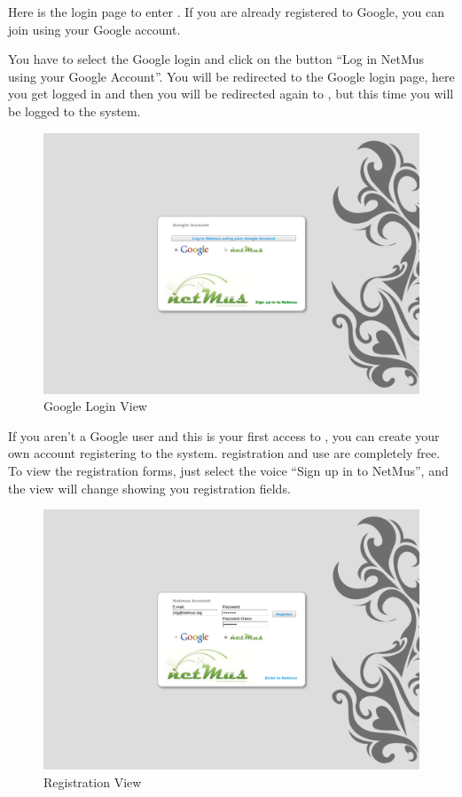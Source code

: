 Here is the login page to enter . If you are already registered to
Google, you can join  using your Google account.

You have to select the Google login and click on the button ``Log in
NetMus using your Google Account''. You will be redirected to the Google login
page, here you get logged in and then you will be redirected again to
, but this time you will be logged to the system.\\

\begin{figure}[htbp]
  \centering
  \includegraphics[width=15cm]{img/MU/loginGoogle.png}
\caption{Google Login View}
\end{figure}


If you aren't a Google user and this is your first access to , you can
create your own account registering to the system.
 registration and use are completely free. \\
To view the registration forms, just select the voice ``Sign up in to NetMus'',
and the view will change showing you registration fields.

\begin{figure}[htbp]
  \centering
  \includegraphics[width=15cm]{img/MU/registration.png}
\caption{Registration View}
\end{figure}


